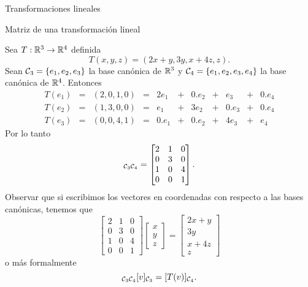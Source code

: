 \begin{chapter}{Transformaciones lineales}
\begin{section}{Matriz de una transformaci\'on lineal}
            \begin{ejemplo*}
                Sea $T: \mathbb R^3 \to \mathbb R^4$ definida
                $$
                T(x,y,z) = (2x+y, 3y, x+4z,z).
                $$
                Sean  $\mathcal{C}_3 = \{e_1,e_2,e_3\}$ la base canónica de $\mathbb R^3$ y  $\mathcal{C}_4 = \{e_1,e_2,e_3,e_4\}$ la base canónica de $\mathbb R^4$. Entonces
                \begin{equation*}
                    \begin{array}{ccccrcrcrcr}
                    T(e_1) & = & (2,0,1,0) & = &  2e_1& + & 0.e_2& + &   e_3& + & 0.e_4  \\
                    T(e_2) & = & (1,3,0,0) & = &   e_1& + &  3e_2& + & 0.e_3& + & 0.e_4  \\
                    T(e_3) & = & (0,0,4,1) & = & 0.e_1& + & 0.e_2& + &  4e_3& + &   e_4
                    \end{array}
                \end{equation*}
                Por  lo tanto
                \begin{equation*}
                        [T]_{\cC_3 \cC_4} =\begin{bmatrix} 2&1&0 \\0&3&0 \\1&0&4 \\0&0&1
                    \end{bmatrix}.
                \end{equation*}
                Observar que si escribimos los vectores en coordenadas con respecto  a las bases canónicas,  tenemos que 
                \begin{equation*}
                \begin{bmatrix} 2&1&0 \\0&3&0 \\1&0&4 \\0&0&1
                \end{bmatrix}
                \begin{bmatrix} x \\ y \\z\end{bmatrix} = 
                \begin{bmatrix} 2x+y\\ 3y\\ x+4z\\z\end{bmatrix}
                \end{equation*}
                o más formalmente
                \begin{equation*}
                    [T]_{\cC_3 \cC_4} [v]_{\cC_3} = [T(v)]_{\cC_4}.
                \end{equation*}
            \end{ejemplo*}
        

\end{section}
\end{chapter}
